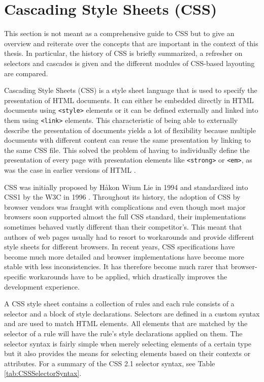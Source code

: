 \section{Cascading Style Sheets (CSS)}

This section is not meant as a comprehensive guide to CSS but to give an overview and reiterate over the concepts that are important in the context of this thesis. In particular, the history of CSS is briefly summarized, a refresher on selectors and cascades is given and the different modules of CSS-based layouting are compared.

Cascading Style Sheets (CSS) is a style sheet language that is used to specify the presentation of HTML documents. It can either be embedded directly in HTML documents using \lstinline{<style>} elements or it can be defined externally and linked into them using \lstinline{<link>} elements. This characteristic of being able to externally describe the presentation of documents yields a lot of flexibility because multiple documents with different content can reuse the same presentation by linking to the same CSS file. This solved the problem of having to individually define the presentation of every page with presentation elements like \lstinline{<strong>} or \lstinline{<em>}, as was the case in earlier versions of HTML \parencite{HTML32}.

CSS was initially proposed by Håkon Wium Lie in 1994 \parencite{CSSProposal} and standardized into CSS1 by the W3C in 1996 \parencite{CSS1}. Throughout its history, the adoption of CSS by browser vendors was fraught with complications and even though most major browsers soon supported almost the full CSS standard, their implementations sometimes behaved vastly different than their competitor's. This meant that authors of web pages usually had to resort to workarounds and provide different style sheets for different browsers. In recent years, CSS specifications have become much more detailed \parencite{CSS21} and browser implementations have become more stable with less inconsistencies. It has therefore become much rarer that browser-specific workarounds have to be applied, which drastically improves the development experience.

A CSS style sheet contains a collection of rules and each rule consists of a selector and a block of style declarations. Selectors are defined in a custom syntax and are used to match HTML elements. All elements that are matched by the selector of a rule will have the rule's style declarations applied on them. The selector syntax is fairly simple when merely selecting elements of a certain type but it also provides the means for selecting elements based on their contexts or attributes. For a summary of the CSS 2.1 selector syntax, see Table \ref{tab:CSSSelectorSyntax}.

